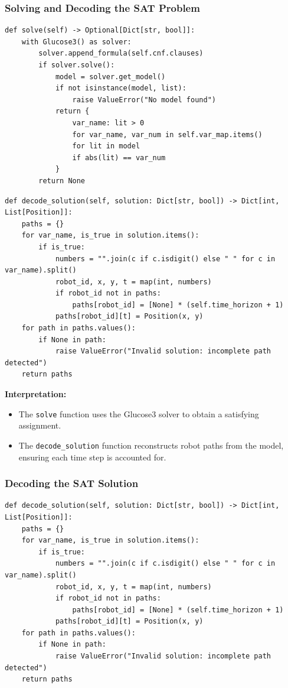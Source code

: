 \documentclass[8pt]{article}
\begin{document}
\subsubsection*{Solving and Decoding the SAT Problem}
\begin{lstlisting}
def solve(self) -> Optional[Dict[str, bool]]:
    with Glucose3() as solver:
        solver.append_formula(self.cnf.clauses)
        if solver.solve():
            model = solver.get_model()
            if not isinstance(model, list):
                raise ValueError("No model found")
            return {
                var_name: lit > 0
                for var_name, var_num in self.var_map.items()
                for lit in model
                if abs(lit) == var_num
            }
        return None
\end{lstlisting}

\begin{lstlisting}
def decode_solution(self, solution: Dict[str, bool]) -> Dict[int, List[Position]]:
    paths = {}
    for var_name, is_true in solution.items():
        if is_true:
            numbers = "".join(c if c.isdigit() else " " for c in var_name).split()
            robot_id, x, y, t = map(int, numbers)
            if robot_id not in paths:
                paths[robot_id] = [None] * (self.time_horizon + 1)
            paths[robot_id][t] = Position(x, y)
    for path in paths.values():
        if None in path:
            raise ValueError("Invalid solution: incomplete path detected")
    return paths
\end{lstlisting}

\textbf{Interpretation:}
\begin{itemize}
    \item The \texttt{solve} function uses the Glucose3 solver to obtain a satisfying assignment.
    \item The \texttt{decode\_solution} function reconstructs robot paths from the model, ensuring each time step is accounted for.
\end{itemize}

\subsubsection*{Decoding the SAT Solution}
\begin{lstlisting}
def decode_solution(self, solution: Dict[str, bool]) -> Dict[int, List[Position]]:
    paths = {}
    for var_name, is_true in solution.items():
        if is_true:
            numbers = "".join(c if c.isdigit() else " " for c in var_name).split()
            robot_id, x, y, t = map(int, numbers)
            if robot_id not in paths:
                paths[robot_id] = [None] * (self.time_horizon + 1)
            paths[robot_id][t] = Position(x, y)
    for path in paths.values():
        if None in path:
            raise ValueError("Invalid solution: incomplete path detected")
    return paths
\end{lstlisting}
\end{document}
